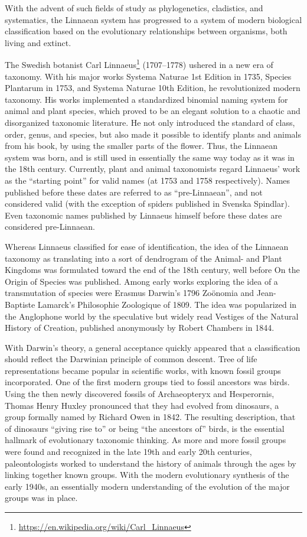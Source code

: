\documentclass[]{book}
\let\rmarkdownfootnote\footnote%
\def\footnote{\protect\rmarkdownfootnote}
\renewcommand{\href}[2]{#2\footnote{\url{#1}}}
\theoremstyle{definition}
\theoremstyle{definition}
\theoremstyle{definition}
\theoremstyle{remark}
\begin{document}
\begin{enumerate}
With the advent of such fields of study as phylogenetics, cladistics,
and systematics, the Linnaean system has progressed to a system of
modern biological classification based on the evolutionary relationships
between organisms, both living and extinct.

The Swedish botanist
\href{https://en.wikipedia.org/wiki/Carl_Linnaeus}{Carl Linnaeus}
(1707--1778) ushered in a new era of taxonomy. With his major works
Systema Naturae 1st Edition in 1735, Species Plantarum in 1753, and
Systema Naturae 10th Edition, he revolutionized modern taxonomy. His
works implemented a standardized binomial naming system for animal and
plant species, which proved to be an elegant solution to a chaotic and
disorganized taxonomic literature. He not only introduced the standard
of class, order, genus, and species, but also made it possible to
identify plants and animals from his book, by using the smaller parts of
the flower. Thus, the Linnaean system was born, and is still used in
essentially the same way today as it was in the 18th century. Currently,
plant and animal taxonomists regard Linnaeus' work as the ``starting
point'' for valid names (at 1753 and 1758 respectively). Names published
before these dates are referred to as ``pre-Linnaean'', and not
considered valid (with the exception of spiders published in Svenska
Spindlar). Even taxonomic names published by Linnaeus himself before
these dates are considered pre-Linnaean.

Whereas Linnaeus classified for ease of identification, the idea of the
Linnaean taxonomy as translating into a sort of dendrogram of the
Animal- and Plant Kingdoms was formulated toward the end of the 18th
century, well before On the Origin of Species was published. Among early
works exploring the idea of a transmutation of species were Erasmus
Darwin's 1796 Zoönomia and Jean-Baptiste Lamarck's Philosophie
Zoologique of 1809. The idea was popularized in the Anglophone world by
the speculative but widely read Vestiges of the Natural History of
Creation, published anonymously by Robert Chambers in 1844.

With Darwin's theory, a general acceptance quickly appeared that a
classification should reflect the Darwinian principle of common descent.
Tree of life representations became popular in scientific works, with
known fossil groups incorporated. One of the first modern groups tied to
fossil ancestors was birds. Using the then newly discovered fossils of
Archaeopteryx and Hesperornis, Thomas Henry Huxley pronounced that they
had evolved from dinosaurs, a group formally named by Richard Owen in
1842. The resulting description, that of dinosaurs ``giving rise to'' or
being ``the ancestors of'' birds, is the essential hallmark of
evolutionary taxonomic thinking. As more and more fossil groups were
found and recognized in the late 19th and early 20th centuries,
paleontologists worked to understand the history of animals through the
ages by linking together known groups. With the modern evolutionary
synthesis of the early 1940s, an essentially modern understanding of the
evolution of the major groups was in place.


\end{enumerate}
\end{document}

